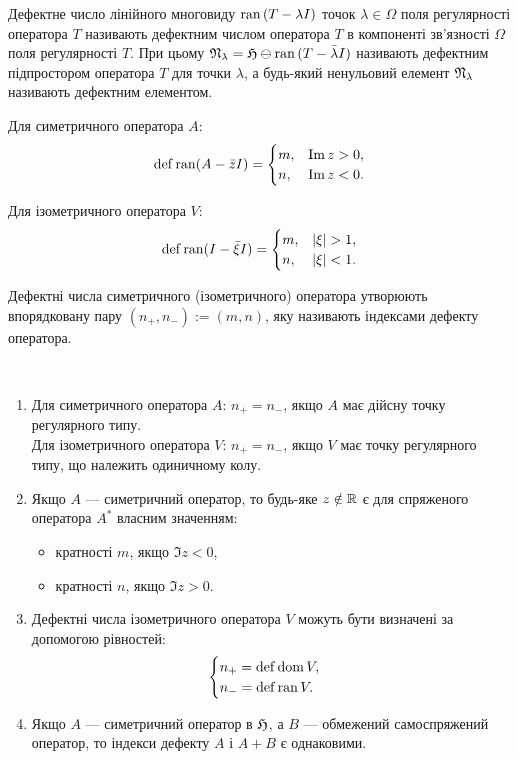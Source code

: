 \begin{definition}
	Дефектне число лінійного многовиду $\operatorname{ran}{(T - \lambda I)}$ точок $\lambda \in \Omega$ поля регулярності оператора $T$ називають дефектним числом оператора $T$ в компоненті зв'язності $\Omega$ поля регулярності $T$. При цьому $\mathfrak{N}_\lambda = \mathfrak{H} \ominus \operatorname{ran}{(T-\bar\lambda I)}$ називають дефектним підпростором оператора $T$ для точки $\lambda$, а будь-який ненульовий елемент $\mathfrak{N}_\lambda$ називають дефектним елементом.
\end{definition}

Для симетричного оператора $A$:
\begin{equation*}
	\operatorname{def} \operatorname{ran} (A-\bar{z}I) = 
	\begin{cases}
		m, & \operatorname{Im} z > 0,\\
		n, & \operatorname{Im} z < 0.
	\end{cases}
\end{equation*}

Для ізометричного оператора $V$:
\begin{equation*}
	\operatorname{def} \operatorname{ran} (I - \bar{\xi}I) = 
	\begin{cases}
		m, & |\xi| > 1,\\
		n, & |\xi| < 1.
	\end{cases}
\end{equation*}

\begin{definition}
	Дефектні числа симетричного (ізометричного) оператора утворюють впорядковану пару $(n_+,n_-) := (m,n)$, яку називають індексами дефекту оператора.
\end{definition}

\begin{corollary} \label{cor2}\
	\begin{enumerate}
		\item Для симетричного оператора $A$: $n_+=n_-$, якщо $A$ має дійсну точку регулярного типу. \\
		Для ізометричного оператора $V$: $n_+=n_-$, якщо $V$ має точку регулярного типу, що належить одиничному колу.
		\item \label{cor2-i2} Якщо $A$ --- симетричний оператор, то будь-яке $z\notin \mathbb{R}$ є для спряженого оператора $A^*$ власним значенням:
		\begin{itemize}
			\item кратності $m$, якщо $\Im z < 0$,
			\item кратності $n$, якщо $\Im z > 0$. 
		\end{itemize}
		\item Дефектні числа ізометричного оператора $V$ можуть бути визначені за допомогою рівностей:
		\begin{equation*}
			\begin{cases}
				n_+ = \operatorname{def} \operatorname{dom} V,\\
				n_- = \operatorname{def} \operatorname{ran} V.
			\end{cases}
		\end{equation*}
		\item Якщо $A$ --- симетричний оператор в $\mathfrak{H}$, а $B$ --- обмежений самоспряжений оператор, то індекси дефекту $A$ і $A+B$ є однаковими.
	\end{enumerate}
\end{corollary}

